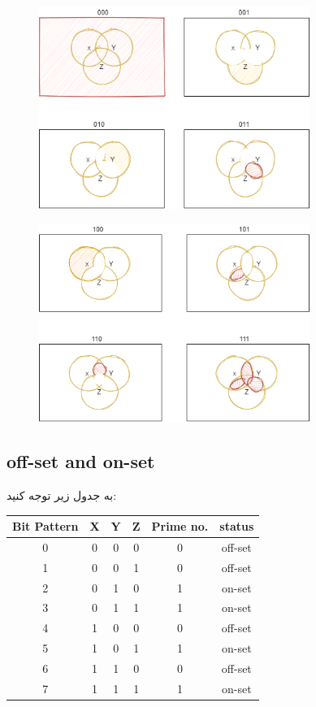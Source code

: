 \documentclass[pt, a5paper]{article}
\begin{document}
\begin{figure}[htbp]
	\centerline{\includegraphics[width=250pt]{img/venn/solution1.png}}
\end{figure}

\begin{figure}[htbp]
	\centerline{\includegraphics[width=250pt]{img/venn/solution2.png}}
\end{figure}
\newpage

\raggedleft
\justifying
\subsection{off-set and on-set}
به جدول زیر توجه کنید:
\center 
\begin{LTR}
	\begin{tabular}{ c | c c c | c | c }
		Bit Pattern & X & Y & Z & Prime no. & status \\
		\hline
		0 & 0 & 0 & 0 & 0 & off-set \\ 				
		1 & 0 & 0 & 1 & 0 & off-set\\
		2 & 0 & 1 & 0 & 1 & on-set\\
		3 & 0 & 1 & 1 & 1 & on-set\\
		4 & 1 & 0 & 0 & 0 & off-set\\
		5 & 1 & 0 & 1 & 1 & on-set\\
		6 & 1 & 1 & 0 & 0 & off-set\\
		7 & 1 & 1 & 1 & 1 & on-set\\	
	\end{tabular}
\end{LTR}
\hfill \break
\end{document}
